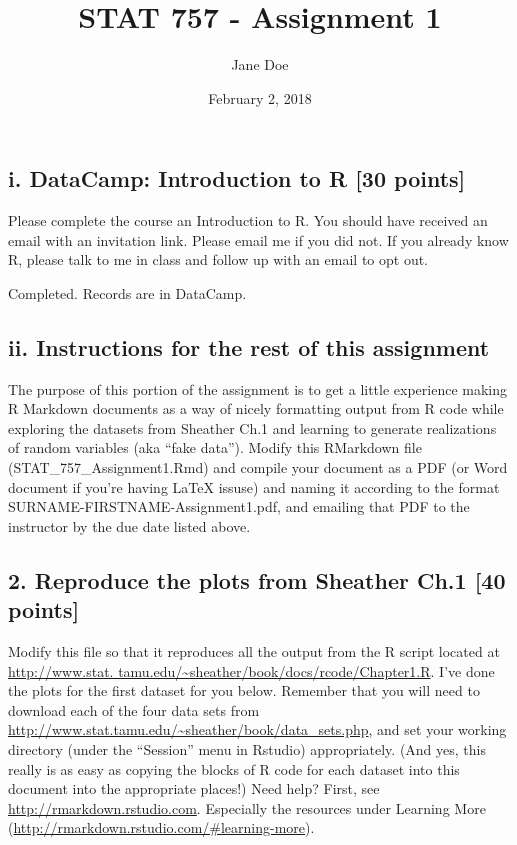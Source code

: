 \documentclass[]{article}
\title{STAT 757 - Assignment 1}
\author{Jane Doe}
\date{February 2, 2018}
\begin{document}
\maketitle

\hypertarget{i.-datacamp-introduction-to-r-30-points}{%
\subsection{i. DataCamp: Introduction to R {[}30
points{]}}\label{i.-datacamp-introduction-to-r-30-points}}

Please complete the course an Introduction to R. You should have
received an email with an invitation link. Please email me if you did
not. If you already know R, please talk to me in class and follow up
with an email to opt out.

Completed. Records are in DataCamp.

\hypertarget{ii.-instructions-for-the-rest-of-this-assignment}{%
\subsection{ii. Instructions for the rest of this
assignment}\label{ii.-instructions-for-the-rest-of-this-assignment}}

The purpose of this portion of the assignment is to get a little
experience making R Markdown documents as a way of nicely formatting
output from R code while exploring the datasets from Sheather Ch.1 and
learning to generate realizations of random variables (aka ``fake
data''). Modify this RMarkdown file (STAT\_757\_Assignment1.Rmd) and
compile your document as a PDF (or Word document if you're having LaTeX
issuse) and naming it according to the format
SURNAME-FIRSTNAME-Assignment1.pdf, and emailing that PDF to the
instructor by the due date listed above.

\hypertarget{reproduce-the-plots-from-sheather-ch.1-40-points}{%
\subsection{2. Reproduce the plots from Sheather Ch.1 {[}40
points{]}}\label{reproduce-the-plots-from-sheather-ch.1-40-points}}

Modify this file so that it reproduces all the output from the R script
located at
\href{http://www.stat.\%20tamu.edu/~sheather/book/docs/rcode/Chapter1.R}{http://www.stat.
tamu.edu/\textasciitilde{}sheather/book/docs/rcode/Chapter1.R}. I've
done the plots for the first dataset for you below. Remember that you
will need to download each of the four data sets from
\url{http://www.stat.tamu.edu/~sheather/book/data_sets.php}, and set
your working directory (under the ``Session'' menu in Rstudio)
appropriately. (And yes, this really is as easy as copying the blocks of
R code for each dataset into this document into the appropriate places!)
Need help? First, see \url{http://rmarkdown.rstudio.com}. Especially the
resources under Learning More
(\url{http://rmarkdown.rstudio.com/\#learning-more}).
\end{document}
